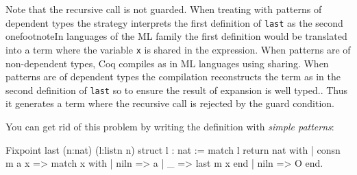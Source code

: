 \begin{itemize}
Note that the recursive call   is not
guarded. When treating with patterns of dependent types the strategy
interprets the first definition of \texttt{last} as the second
onefootnote{In languages of the ML family
the first definition would be translated into a term where the
variable \texttt{x} is shared in the expression.  When
patterns are of non-dependent types, Coq compiles as in ML languages
using sharing. When patterns are of dependent types the compilation
reconstructs the term as in the second definition of \texttt{last} so to
ensure the result of expansion is well typed.}.
Thus it generates a
term where the recursive call is rejected by the 
guard condition.

You can get rid of this problem by writing the definition with \emph{simple
patterns}:

\begin{coq_example}
Fixpoint last (n:nat) (l:listn n) {struct l} : nat :=
  match l return nat with
  | consn m a x => match x with
                   | niln => a
                   | _ => last m x
                   end
  | niln => O
  end.
\end{coq_example}


\end{itemize}

%

